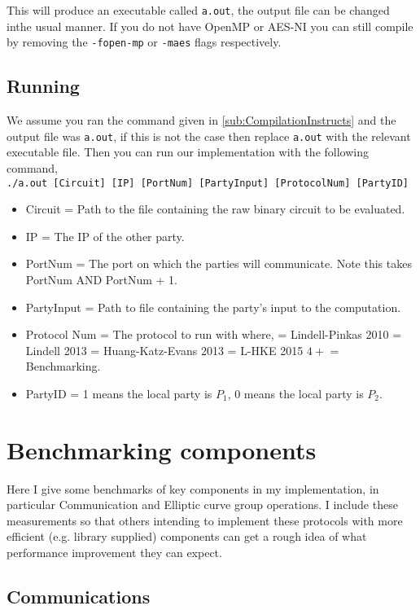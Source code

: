 \documentclass[ %
                    author={Nicholas Tutte},
                supervisor={Prof. Nigel Smart},
                    degree={MEng},
                     title={Secure Two Party Computation},
                  subtitle={A practical comparison of recent protocols},
                      type={Research - GG1K},
                      year={2015} ]{dissertation}
\begin{document}
\begin{appendices}
					This will produce an executable called \texttt{a.out}, the output file can be changed inthe usual manner. If you do not have OpenMP or AES-NI you can still compile by removing the \texttt{-fopen-mp} or \texttt{-maes} flags respectively.


			\section{Running}
				We assume you ran the command given in \ref{sub:CompilationInstructs} and the output file was \texttt{a.out}, if this is not the case then replace \texttt{a.out} with the relevant executable file. Then you can run our implementation with the following command,\\

				\texttt{./a.out [Circuit] [IP] [PortNum] [PartyInput] [ProtocolNum] [PartyID]}

				\begin{itemize}
					\item Circuit = Path to the file containing the raw binary circuit to be evaluated.
					\item IP = The IP of the other party.
					\item PortNum = The port on which the parties will communicate. Note this takes PortNum AND PortNum + 1.
					\item PartyInput = Path to file containing the party's input to the computation.
					\item Protocol Num = The protocol to run with where,
						 = Lindell-Pinkas 2010
						 = Lindell 2013
						 = Huang-Katz-Evans 2013
						 = L-HKE 2015
						\subitem $4+$ = Benchmarking.
					\item PartyID = 1 means the local party is $P_1$, 0 means the local party is $P_2$.
				\end{itemize}

		\chapter{Benchmarking components}
			Here I give some benchmarks of key components in my implementation, in particular Communication and Elliptic curve group operations. I include these measurements so that others intending to implement these protocols with more efficient (e.g. library supplied) components can get a rough idea of what performance improvement they can expect.

			\section{Communications}


\end{appendices}
\end{document}
